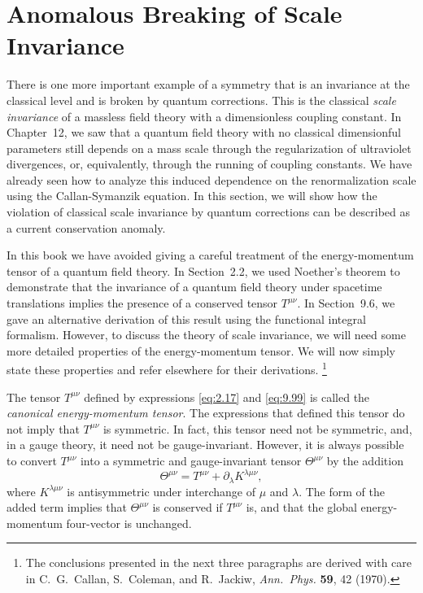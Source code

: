 \section{Anomalous Breaking of Scale Invariance}

There is one more important example of a symmetry that is an invariance at
the classical level and is broken by quantum corrections.  This is the
classical \emph{scale invariance} of a massless field theory with a
dimensionless coupling constant.  In Chapter~12, we saw that a quantum field
theory with no classical dimensionful parameters still depends on a mass
scale through the regularization of ultraviolet divergences, or, equivalently,
through the running of coupling constants.  We have already seen how to
analyze this induced dependence on the renormalization scale using the
Callan-Symanzik equation.  In this section, we will show how the violation
of classical scale invariance by quantum corrections can be described as a
current conservation anomaly.

In this book we have avoided giving a careful treatment of the energy-momentum
tensor of a quantum field theory.  In Section~2.2, we used Noether's theorem
to demonstrate that the invariance of a quantum field theory under spacetime
translations implies the presence of a conserved tensor $T^{\mu\nu}$.  In
Section~9.6, we gave an alternative derivation of this result using the
functional integral formalism.  However, to discuss the theory of scale
invariance, we will need some more detailed properties of the energy-momentum
tensor.  We will now simply state these properties and refer elsewhere for
their derivations.%
\footnote{The conclusions presented in the next three paragraphs are derived
with care in C.~G.~Callan, S.~Coleman, and R.~Jackiw, \emph{Ann.\ Phys.}
\textbf{59}, 42 (1970).}

The tensor $T^{\mu\nu}$ defined by expressions \eqref{eq:2.17} and
\eqref{eq:9.99} is called the \emph{canonical energy-momentum tensor}.  The
expressions that defined this tensor do not imply that $T^{\mu\nu}$ is
symmetric.  In fact, this tensor need not be symmetric, and, in a gauge
theory, it need not be gauge-invariant.  However, it is always possible to
convert $T^{\mu\nu}$ into a symmetric and gauge-invariant tensor $\Theta^{\mu\nu}$
by the addition
\begin{equation}
  \Theta^{\mu\nu} = T^{\mu\nu} + \partial_\lambda K^{\lambda\mu\nu} ,
  \label{eq:19.144}
\end{equation}
where $K^{\lambda\mu\nu}$ is antisymmetric under interchange of $\mu$ and
$\lambda$.  The form of the added term implies that $\Theta^{\mu\nu}$ is
conserved if $T^{\mu\nu}$ is, and that the global energy-momentum four-vector
is unchanged.

